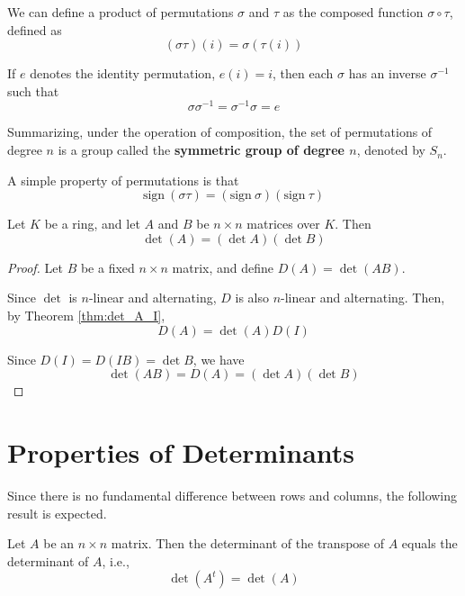 \begin{remark}
	We can define a product of permutations $\sigma$ and $\tau$ as the composed function $\sigma \circ \tau$, defined as
	\[
		(\sigma \tau)(i) = \sigma(\tau(i))
	\]
	
	If $e$ denotes the identity permutation, $e(i) = i$, then each $\sigma$ has an inverse $\sigma^{-1}$ such that
	\[
		\sigma \sigma^{-1} = \sigma^{-1} \sigma = e
	\]
	
	Summarizing, under the operation of composition, the set of permutations of degree $n$ is a group called the \textbf{symmetric group of degree $n$}, denoted by $S_n$.
	
	A simple property of permutations is that
	\[
		\text{sign} ~(\sigma \tau) = (\text{sign} ~\sigma)(\text{sign} ~\tau)
	\]
\end{remark}

\begin{theorem}
	Let $K$ be a ring, and let $A$ and $B$ be $n \times n$ matrices over $K$. Then
	\[
		\det(A) = (\det A)(\det B)
	\]
\end{theorem}

\begin{proof}
	Let $B$ be a fixed $n \times n$ matrix, and define $D(A) = \det(AB)$.
	
	Since $\det$ is $n$-linear and alternating, $D$ is also $n$-linear and alternating. Then, by Theorem \ref{thm:det_A_I},
	\[
		D(A) = \det(A) D(I)
	\]
	
	Since $D(I) = D(IB) = \det B$, we have
	\[
		\det(AB) = D(A) = (\det A)(\det B)
	\]
\end{proof}

\section{Properties of Determinants}

Since there is no fundamental difference between rows and columns, the following result is expected.

\begin{theorem}
	Let $A$ be an $n \times n$ matrix. Then the determinant of the transpose of $A$ equals the determinant of $A$, i.e., 
	\[
		\det(A^t) = \det (A)
	\]
\end{theorem}

